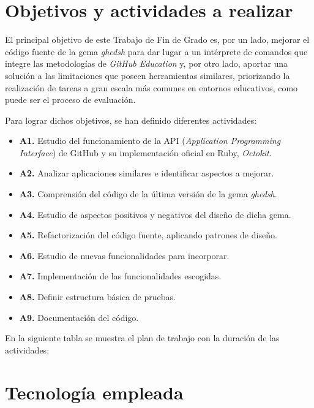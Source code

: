 \section{Objetivos y actividades a realizar}
\label{1:sec:3}

El principal objetivo de este Trabajo de Fin de Grado es, por un lado, mejorar el código fuente de la gema {\it ghedsh} para dar lugar a un intérprete de comandos que 
integre las metodologías de {\it GitHub Education} y, por otro lado, aportar una solución a las limitaciones que poseen herramientas similares, priorizando
la realización de tareas a gran escala más comunes en entornos educativos, como puede ser el proceso de evaluación.
\bigskip

Para lograr dichos objetivos, se han definido diferentes actividades:
\begin{itemize}
  \item {\bf A1.} Estudio del funcionamiento de la API ({\it Application Programming Interface}) de GitHub y su implementación oficial en Ruby, {\it Octokit}.
  \item {\bf A2.} Analizar aplicaciones similares e identificar aspectos a mejorar.
  \item {\bf A3.} Comprensión del código de la última versión de la gema {\it ghedsh}.
  \item {\bf A4.} Estudio de aspectos positivos y negativos del diseño de dicha gema.
  \item {\bf A5.} Refactorización del código fuente, aplicando patrones de diseño.
  \item {\bf A6.} Estudio de nuevas funcionalidades para incorporar.
  \item {\bf A7.} Implementación de las funcionalidades escogidas.
  \item {\bf A8.} Definir estructura básica de pruebas.
  \item {\bf A9.} Documentación del código.
\end{itemize}
\bigskip

En la siguiente tabla se muestra el plan de trabajo con la duración de las actividades:


\section{Tecnología empleada}
\label{1:sec:4}
 
